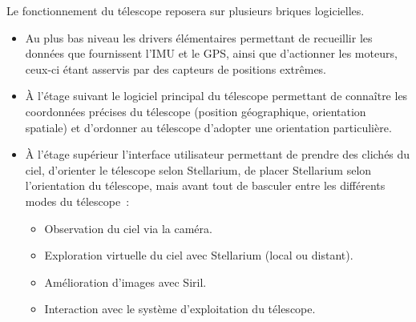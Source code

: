 \vspace{1cm}

Le fonctionnement du télescope reposera sur plusieurs briques logicielles.
\begin{itemize}[label=$\bullet$]
	\item Au plus bas niveau les drivers élémentaires permettant de recueillir les données que fournissent l'IMU et le GPS, ainsi que d'actionner les moteurs, ceux-ci étant asservis par des capteurs de positions extrêmes.
	\item À l'étage suivant le logiciel principal du télescope permettant de connaître les coordonnées précises du télescope (position géographique, orientation spatiale) et d'ordonner au télescope d'adopter une orientation particulière.
	\item À l'étage supérieur l'interface utilisateur permettant de prendre des clichés du ciel, d'orienter le télescope selon Stellarium, de placer Stellarium selon l'orientation du télescope, mais avant tout de basculer entre les différents modes du télescope~:
	\begin{itemize}
		\item Observation du ciel via la caméra.
		\item Exploration virtuelle du ciel avec Stellarium (local ou distant).
		\item Amélioration d'images avec Siril.
		\item Interaction avec le système d'exploitation du télescope.
		\end{itemize}
	\end{itemize}



